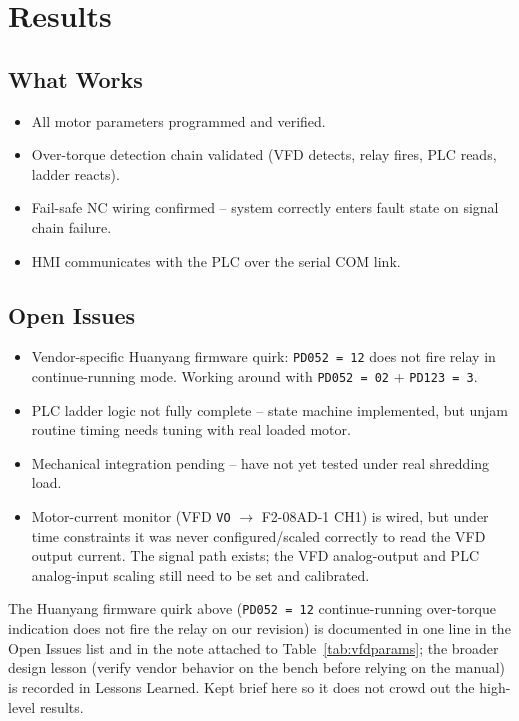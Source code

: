 \documentclass[hidelinks,12pt]{article}
\begin{document}
\section{Results}

\subsection{What Works}
\begin{itemize}
    \item All motor parameters programmed and verified.
    \item Over-torque detection chain validated (VFD detects, relay fires, PLC reads, ladder reacts).
    \item Fail-safe NC wiring confirmed -- system correctly enters fault state on signal chain failure.
    \item HMI communicates with the PLC over the serial COM link.
\end{itemize}

\subsection{Open Issues}
\begin{itemize}
    \item Vendor-specific Huanyang firmware quirk: \texttt{PD052 = 12} does not fire relay in continue-running mode. Working around with \texttt{PD052 = 02} + \texttt{PD123 = 3}.
    \item PLC ladder logic not fully complete -- state machine implemented, but unjam routine timing needs tuning with real loaded motor.
    \item Mechanical integration pending -- have not yet tested under real shredding load.
    \item Motor-current monitor (VFD \texttt{VO} $\rightarrow$ F2-08AD-1 CH1) is wired, but under time constraints it was never configured/scaled correctly to read the VFD output current. The signal path exists; the VFD analog-output and PLC analog-input scaling still need to be set and calibrated.
\end{itemize}

The Huanyang firmware quirk above (\texttt{PD052 = 12} continue-running
over-torque indication does not fire the relay on our revision) is
documented in one line in the Open Issues list and in the note attached
to Table~\ref{tab:vfdparams}; the broader design lesson (verify vendor
behavior on the bench before relying on the manual) is recorded in
Lessons Learned. Kept brief here so it does not crowd out the high-level
results.
\end{document}
